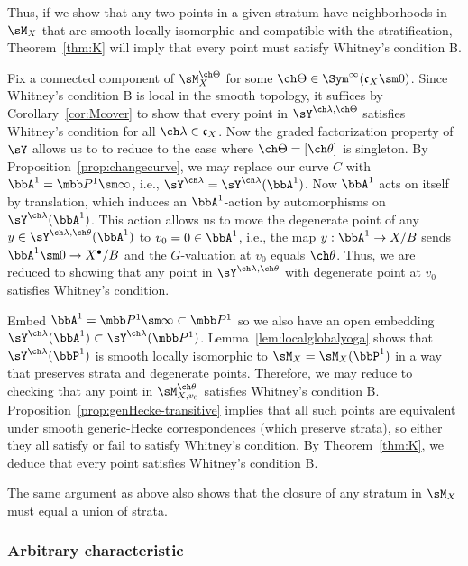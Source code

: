 Thus, if we show that any two points in a given stratum have neighborhoods in $\sM_X$
that are smooth locally isomorphic and compatible with the stratification,
Theorem~\ref{thm:K} will imply that every point
must satisfy Whitney's condition B.



Fix a connected component of $\sM_X^{\ch\Theta}$
for some $\ch\Theta \in \Sym^\infty(\mathfrak c_X \sm 0)$.
Since Whitney's condition B is local in the smooth topology,
it suffices by Corollary~\ref{cor:Mcover} to show that every point in
$\sY^{\ch\lambda,\ch\Theta}$
satisfies Whitney's condition for all $\ch\lambda \in \mathfrak c_X$.
Now the graded factorization property of $\sY$ allows us to
to reduce to the case where $\ch\Theta = [\ch\theta]$ is singleton.
By Proposition~\ref{prop:changecurve}, we may replace our curve $C$
with $\bbA^1 = \mbb P^1 \sm \infty$, i.e., $\sY^{\ch\lambda}=\sY^{\ch\lambda}(\bbA^1)$.
Now $\bbA^1$ acts on itself by translation, which induces
an $\bbA^1$-action by automorphisms on $\sY^{\ch\lambda}(\bbA^1)$.
This action allows us to move the degenerate point of any
$y \in \sY^{\ch\lambda,\ch\theta}(\bbA^1)$ to $v_0=0 \in \bbA^1$, i.e.,
the map $y:\bbA^1 \to X/B$ sends $\bbA^1 \sm 0 \to X^\bullet/B$ and
the $G$-valuation at $v_0$ equals $\ch\theta$.
Thus, we are reduced to showing that any point in
$\sY^{\ch\lambda,\ch\theta}$ with degenerate point at $v_0$ satisfies Whitney's condition.

Embed $\bbA^1 = \mbb P^1 \sm \infty \subset \mbb P^1$ so we
also have an open embedding $\sY^{\ch\lambda}(\bbA^1) \subset \sY^{\ch\lambda}(\mbb P^1)$.
Lemma~\ref{lem:localglobalyoga} shows that $\sY^{\ch\lambda}(\bbP^1)$
is smooth locally isomorphic to $\sM_X=\sM_X(\bbP^1)$ in a way that preserves strata
and degenerate points. Therefore, we may reduce to checking
that any point in $\sM_{X,v_0}^{\ch\theta}$ satisfies Whitney's condition B.
Proposition~\ref{prop:genHecke-transitive} implies that
all such points are equivalent under smooth generic-Hecke correspondences
(which preserve strata), so either they all satisfy or fail to satisfy
Whitney's condition. By Theorem~\ref{thm:K}, we deduce that every
point satisfies Whitney's condition B.



The same argument as above also shows that the closure of any stratum in $\sM_X$
must equal a union of strata.

\subsubsection{Arbitrary characteristic}

